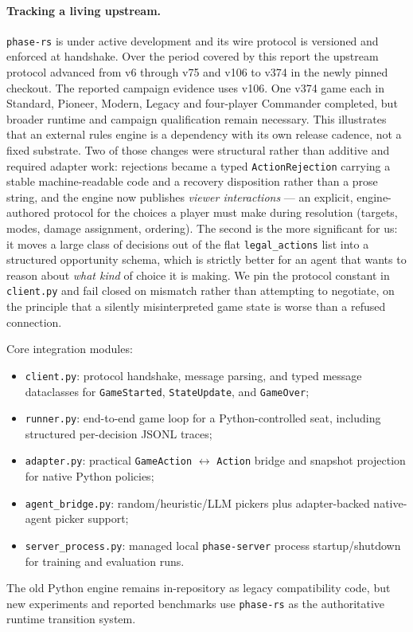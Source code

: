 \documentclass[11pt,a4paper]{article}
\theoremstyle{definition}
\theoremstyle{plain}
\begin{document}
\paragraph{Tracking a living upstream.} \texttt{phase-rs} is under active
development and its wire protocol is versioned and enforced at handshake.
Over the period covered by this report the upstream protocol advanced from
v6 through v75 and v106 to v374 in the newly pinned checkout. The reported
campaign evidence uses v106. One v374 game each in Standard, Pioneer, Modern,
Legacy and four-player Commander completed, but broader runtime and campaign
qualification remain necessary. This illustrates that an external rules engine is a
dependency with its own release cadence, not a fixed substrate. Two of
those changes were structural rather than additive and required adapter
work: rejections became a typed \texttt{ActionRejection} carrying a stable
machine-readable code and a recovery disposition rather than a prose
string, and the engine now publishes \emph{viewer interactions} --- an
explicit, engine-authored protocol for the choices a player must make
during resolution (targets, modes, damage assignment, ordering). The
second is the more significant for us: it moves a large class of
decisions out of the flat \texttt{legal\_actions} list into a structured
opportunity schema, which is strictly better for an agent that wants to
reason about \emph{what kind} of choice it is making. We pin the protocol
constant in \texttt{client.py} and fail closed on mismatch rather than
attempting to negotiate, on the principle that a silently
misinterpreted game state is worse than a refused connection.

Core integration modules:
\begin{itemize}[leftmargin=1.2em, itemsep=1pt]
  \item \texttt{client.py}: protocol handshake, message parsing, and typed
    message dataclasses for \texttt{GameStarted}, \texttt{StateUpdate},
    and \texttt{GameOver};
  \item \texttt{runner.py}: end-to-end game loop for a Python-controlled seat,
    including structured per-decision JSONL traces;
  \item \texttt{adapter.py}: practical \texttt{GameAction} $\leftrightarrow$
    \texttt{Action} bridge and snapshot projection for native Python
    policies;
  \item \texttt{agent\_bridge.py}: random/heuristic/LLM pickers plus
    adapter-backed native-agent picker support;
  \item \texttt{server\_process.py}: managed local \texttt{phase-server}
    process startup/shutdown for training and evaluation runs.
\end{itemize}
The old Python engine remains in-repository as legacy compatibility code,
but new experiments and reported benchmarks use \texttt{phase-rs} as the
authoritative runtime transition system.
\end{document}
